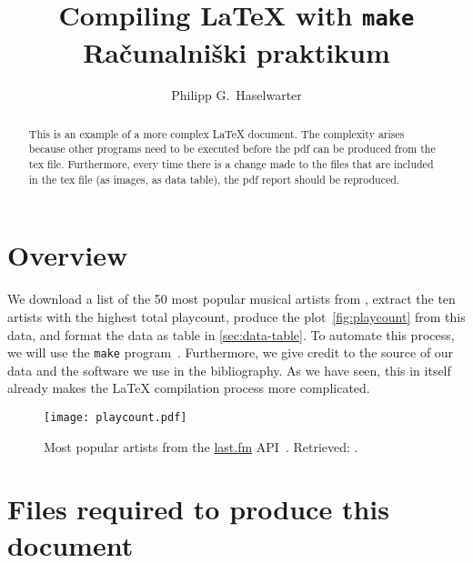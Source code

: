 \documentclass[a4paper,11pt]{article}
\begin{document}
\author{Philipp G.~Haselwarter}
\title{Compiling \LaTeX{} with \texttt{make} \\[.2\baselineskip]
  \large Ra\v{c}unalni\v{s}ki praktikum}

\maketitle{}

\begin{abstract}
This is an example of a more complex \LaTeX{} document. The complexity arises because other programs need to be executed before the pdf can be produced from the tex file. Furthermore, every time there is a change made to the files that are included in the tex file (as images, as data table), the pdf report should be reproduced.
\end{abstract}

\section*{Overview}

We download a list of the 50 most popular musical artists from \cite{lastfm}, extract the ten artists with the highest total playcount, produce the plot~\autoref{fig:playcount} from this data, and format the data as table in \autoref{sec:data-table}. To automate this process, we will use the \texttt{make} program~\cite{gnumake}. Furthermore, we give credit to the source of our data and the software we use in the bibliography. As we have seen, this in itself already makes the \LaTeX{} compilation process more complicated.

\begin{figure}[h]
  \centering
  \texttt{[image: playcount.pdf]}
  \caption{Most popular artists from the \href{https://www.last.fm/}{last.fm} API~\cite{lastfm:API}.
  Retrieved: \datedownloaded{}.}
\end{figure}

\tableofcontents{}

\section{Files required to produce this document}
\end{document}
